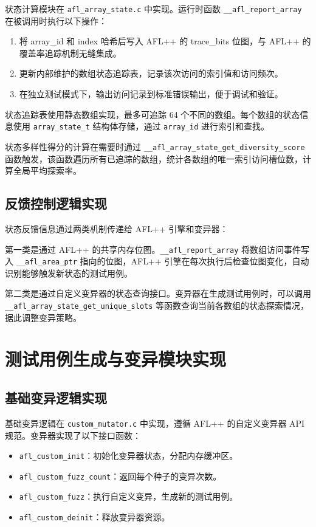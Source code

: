 \documentclass[bachelor]{njupthesis}
\begin{document}
状态计算模块在 \texttt{afl\_array\_state.c} 中实现。运行时函数 \texttt{\_\_afl\_report\_array} 在被调用时执行以下操作：

\begin{enumerate}
    \item 将 array\_id 和 index 哈希后写入 AFL++ 的 trace\_bits 位图，与 AFL++ 的覆盖率追踪机制无缝集成。
    \item 更新内部维护的数组状态追踪表，记录该次访问的索引值和访问频次。
    \item 在独立测试模式下，输出访问记录到标准错误输出，便于调试和验证。
\end{enumerate}

状态追踪表使用静态数组实现，最多可追踪 64 个不同的数组。每个数组的状态信息使用 \texttt{array\_state\_t} 结构体存储，通过 \texttt{array\_id} 进行索引和查找。

状态多样性得分的计算在需要时通过 \texttt{\_\_afl\_array\_state\_get\_diversity\_score} 函数触发，该函数遍历所有已追踪的数组，统计各数组的唯一索引访问槽位数，计算全局平均探索率。

\subsection{反馈控制逻辑实现}

状态反馈信息通过两类机制传递给 AFL++ 引擎和变异器：

第一类是通过 AFL++ 的共享内存位图。\texttt{\_\_afl\_report\_array} 将数组访问事件写入 \texttt{\_\_afl\_area\_ptr} 指向的位图，AFL++ 引擎在每次执行后检查位图变化，自动识别能够触发新状态的测试用例。

第二类是通过自定义变异器的状态查询接口。变异器在生成测试用例时，可以调用 \texttt{\_\_afl\_array\_state\_get\_unique\_slots} 等函数查询当前各数组的状态探索情况，据此调整变异策略。

\section{测试用例生成与变异模块实现}

\subsection{基础变异逻辑实现}

基础变异逻辑在 \texttt{custom\_mutator.c} 中实现，遵循 AFL++ 的自定义变异器 API 规范。变异器实现了以下接口函数：

\begin{itemize}
    \item \texttt{afl\_custom\_init}：初始化变异器状态，分配内存缓冲区。
    \item \texttt{afl\_custom\_fuzz\_count}：返回每个种子的变异次数。
    \item \texttt{afl\_custom\_fuzz}：执行自定义变异，生成新的测试用例。
    \item \texttt{afl\_custom\_deinit}：释放变异器资源。
\end{itemize}
\end{document}
